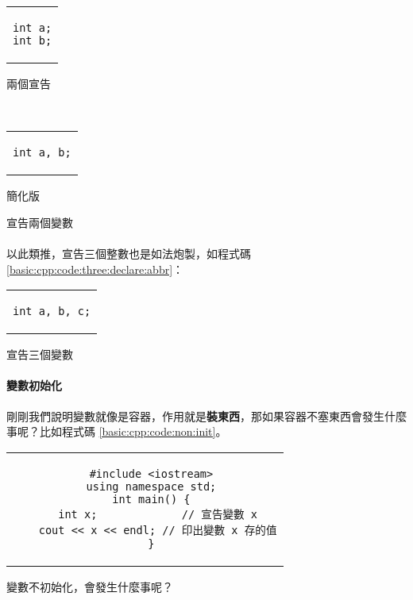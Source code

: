 \documentclass[12pt,a4paper,oneside]{report}
\begin{document}
\begin{CJK}{UTF8}{bkai}
\begin{code}[h!]
  \centering
  \begin{subcode}{.33\textwidth}
    \centering
    \begin{tabular}{c}
    \begin{lstlisting}
int a;
int b;
    \end{lstlisting}
    \end{tabular}
    \caption{兩個宣告}
    \label{basic:cpp:code:two:declare}
  \end{subcode}
  ~
  \begin{subcode}{.33\textwidth}
    \centering
    \begin{tabular}{c}
    \begin{lstlisting}
int a, b;
    \end{lstlisting}
    \end{tabular}
    \caption{簡化版}
    \label{basic:cpp:code:two:declare:abbr}
  \end{subcode}
  \caption{宣告兩個變數}
  \label{basic:cpp:code:two:declare:total}
\end{code}

\paragraph{}以此類推，宣告三個整數也是如法炮製，如程式碼 \ref{basic:cpp:code:three:declare:abbr}：
\begin{code}[h!]
\centering
\begin{tabular}{c}
\begin{lstlisting}
int a, b, c;
\end{lstlisting}
\end{tabular}
\caption{宣告三個變數}
\label{basic:cpp:code:three:declare:abbr}
\end{code}

\paragraph{變數初始化}剛剛我們說明變數就像是容器，作用就是\textbf{裝東西}，那如果容器不塞東西會發生什麼事呢？比如程式碼 \ref{basic:cpp:code:non:init}。

\begin{code}[h!]
\centering
\begin{tabular}{c}
\begin{lstlisting}
  #include <iostream>
  using namespace std;
  int main() {
    int x;             // 宣告變數 x
    cout << x << endl; // 印出變數 x 存的值
  }
\end{lstlisting}
\end{tabular}
\caption{變數不初始化，會發生什麼事呢？}
\label{basic:cpp:code:non:init}
\end{code}


\end{CJK}
\end{document}
